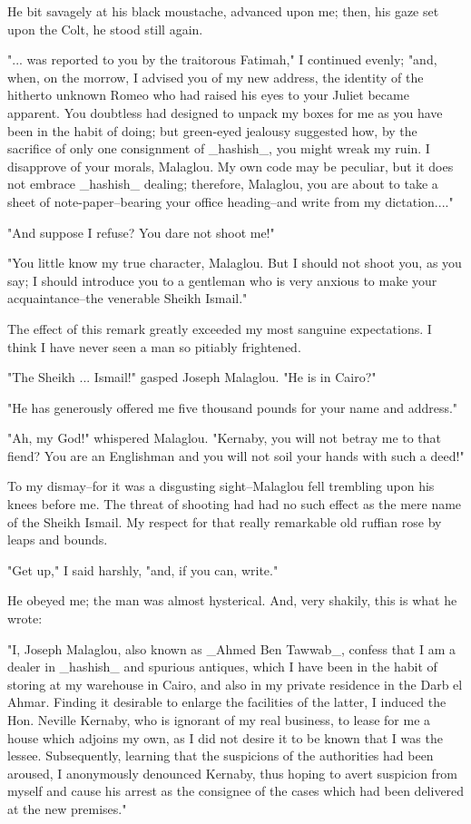 He bit savagely at his black moustache, advanced upon me; then, his
gaze set upon the Colt, he stood still again.

"... was reported to you by the traitorous Fatimah," I continued
evenly; "and, when, on the morrow, I advised you of my new address,
the identity of the hitherto unknown Romeo who had raised his eyes to
your Juliet became apparent. You doubtless had designed to unpack my
boxes for me as you have been in the habit of doing; but green-eyed
jealousy suggested how, by the sacrifice of only one consignment of
_hashish_, you might wreak my ruin. I disapprove of your morals,
Malaglou. My own code may be peculiar, but it does not embrace
_hashish_ dealing; therefore, Malaglou, you are about to take a sheet
of note-paper--bearing your office heading--and write from my
dictation...."

"And suppose I refuse? You dare not shoot me!"

"You little know my true character, Malaglou. But I should not shoot
you, as you say; I should introduce you to a gentleman who is very
anxious to make your acquaintance--the venerable Sheikh Ismail."

The effect of this remark greatly exceeded my most sanguine
expectations. I think I have never seen a man so pitiably frightened.

"The Sheikh ... Ismail!" gasped Joseph Malaglou. "He is in Cairo?"

"He has generously offered me five thousand pounds for your name and
address."

"Ah, my God!" whispered Malaglou. "Kernaby, you will not betray me
to that fiend? You are an Englishman and you will not soil your hands
with such a deed!"

To my dismay--for it was a disgusting sight--Malaglou fell trembling
upon his knees before me. The threat of shooting had had no such
effect as the mere name of the Sheikh Ismail. My respect for that
really remarkable old ruffian rose by leaps and bounds.

"Get up," I said harshly, "and, if you can, write."

He obeyed me; the man was almost hysterical. And, very shakily, this
is what he wrote:

  "I, Joseph Malaglou, also known as _Ahmed Ben Tawwab_, confess
  that I am a dealer in _hashish_ and spurious antiques, which I have
  been in the habit of storing at my warehouse in Cairo, and also in
  my private residence in the Darb el Ahmar. Finding it desirable to
  enlarge the facilities of the latter, I induced the Hon. Neville
  Kernaby, who is ignorant of my real business, to lease for me a
  house which adjoins my own, as I did not desire it to be known that
  I was the lessee. Subsequently, learning that the suspicions of the
  authorities had been aroused, I anonymously denounced Kernaby, thus
  hoping to avert suspicion from myself and cause his arrest as the
  consignee of the cases which had been delivered at the new
  premises."

